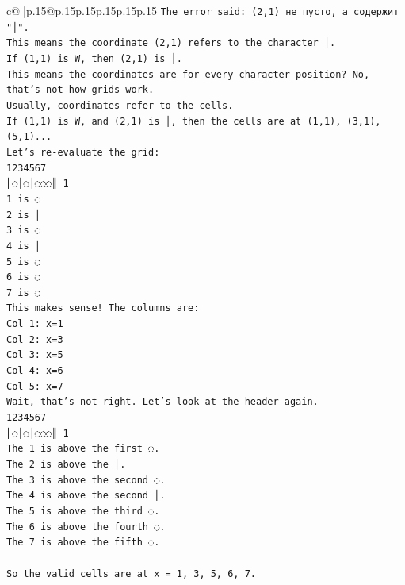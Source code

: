 \documentclass{article}
\begin{document}
{\begin{supertabular}{c@{$\;$}|p{.15\linewidth}@{}p{.15\linewidth}p{.15\linewidth}p{.15\linewidth}p{.15\linewidth}p{.15\linewidth}}
{{{\texttt{The error said: (2,1) не пусто, а содержит "│".} \\
\texttt{This means the coordinate (2,1) refers to the character │.} \\
\texttt{If (1,1) is W, then (2,1) is │.} \\
\texttt{This means the coordinates are for every character position? No, that's not how grids work.} \\
\texttt{Usually, coordinates refer to the cells.} \\
\texttt{If (1,1) is W, and (2,1) is │, then the cells are at (1,1), (3,1), (5,1)...} \\
\texttt{Let's re{-}evaluate the grid:} \\
\texttt{1234567} \\
\texttt{║◌│◌│◌◌◌║ 1} \\
\texttt{1 is ◌} \\
\texttt{2 is │} \\
\texttt{3 is ◌} \\
\texttt{4 is │} \\
\texttt{5 is ◌} \\
\texttt{6 is ◌} \\
\texttt{7 is ◌} \\
\texttt{This makes sense! The columns are:} \\
\texttt{Col 1: x=1} \\
\texttt{Col 2: x=3} \\
\texttt{Col 3: x=5} \\
\texttt{Col 4: x=6} \\
\texttt{Col 5: x=7} \\
\texttt{Wait, that's not right. Let's look at the header again.} \\
\texttt{1234567} \\
\texttt{║◌│◌│◌◌◌║ 1} \\
\texttt{The 1 is above the first ◌.} \\
\texttt{The 2 is above the │.} \\
\texttt{The 3 is above the second ◌.} \\
\texttt{The 4 is above the second │.} \\
\texttt{The 5 is above the third ◌.} \\
\texttt{The 6 is above the fourth ◌.} \\
\texttt{The 7 is above the fifth ◌.} \\
\\ 
\texttt{So the valid cells are at x = 1, 3, 5, 6, 7.} \\
}}}
\end{supertabular}}
\end{document}
